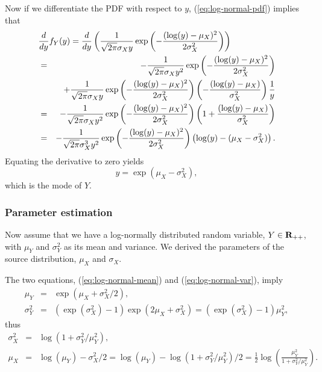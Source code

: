 Now if we differentiate the PDF with respect to $y$,
(\ref{eq:log-normal-pdf}) implies that
\begin{eqnarray*}
\lefteqn{
\frac{d}{dy} f_Y(y)
= \frac{d}{dy} \left(\frac{1}{\sqrt{2\pi} \sigma_X y}  \exp\left(-\frac{(\log(y)-\mu_X)^2}{2\sigma_X^2}\right)\right)
}
\\
&=&
-\frac{1}{\sqrt{2\pi} \sigma_X y^2}  \exp\left(-\frac{(\log(y)-\mu_X)^2}{2\sigma_X^2}\right)
\\
&&
+
\frac{1}{\sqrt{2\pi} \sigma_X y}  \exp\left(-\frac{(\log(y)-\mu_X)^2}{2\sigma_X^2}\right)
\left(-\frac{(\log(y)-\mu_X)}{\sigma_X^2}\right)
\frac{1}{y}
\\
&=&
-\frac{1}{\sqrt{2\pi} \sigma_X y^2}  \exp\left(-\frac{(\log(y)-\mu_X)^2}{2\sigma_X^2}\right)
\left(1+\frac{(\log(y)-\mu_X)}{\sigma_X^2} \right)
\\
&=&
-\frac{1}{\sqrt{2\pi} \sigma_X^3 y^2}  \exp\left(-\frac{(\log(y)-\mu_X)^2}{2\sigma_X^2}\right)
\left(\log(y)-(\mu_X-\sigma_X^2) \right).
\end{eqnarray*}
Equating the derivative to zero yields
\begin{equation}
y = \exp(\mu_X-\sigma_X^2),
\end{equation}
which is the mode of $Y$.


\subsubsection{Parameter estimation}

Now assume that we have a log-normally distributed random variable, $Y\in{\mathbf{R}_{++}}$,
with $\mu_Y$ and $\sigma_Y^2$ as its mean and variance.
We derived the parameters of the source distribution, $\mu_X$ and $\sigma_X$.

The two equations, (\ref{eq:log-normal-mean}) and (\ref{eq:log-normal-var}), imply
\begin{eqnarray*}
\mu_Y &=& \exp(\mu_X+\sigma_X^2/2),
\\
\sigma_Y^2 &=& (\exp(\sigma_X^2)-1)\exp(2\mu_X+\sigma_X^2) = (\exp(\sigma_X^2)-1) \mu_Y^2,
\end{eqnarray*}
thus
\begin{eqnarray*}
\sigma_X^2 &=& \log(1+{\sigma_Y^2}/{\mu_Y^2}),
\\
\mu_X &=& \log(\mu_Y) - \sigma_X^2/2 = \log(\mu_Y) - \log(1+{\sigma_Y^2}/{\mu_Y^2})/2
= \frac{1}{2} \log\left(\frac{\mu_Y^2}{1+{\sigma_Y^2}/{\mu_Y^2}}\right).
\end{eqnarray*}
